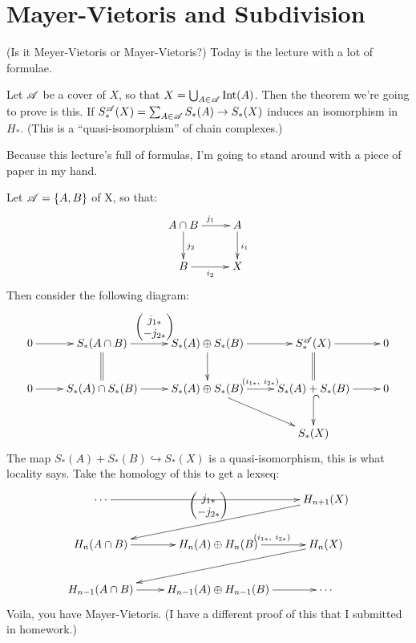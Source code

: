 \section{Mayer-Vietoris and Subdivision}
(Is it Meyer-Vietoris or Mayer-Vietoris?) Today is the lecture with a lot of formulae.
\begin{theorem}
Let $\mathscr{A}$ be a cover of $X$, so that $X=\bigcup_{A\in \mathscr{A}}\mathrm{Int}(A)$. Then the theorem we're going to prove is this. If $S^{\mathscr{A}}_\ast(X)=\sum_{A\in\mathscr{A}}S_\ast(A)\to S_\ast(X)$ induces an isomorphism in $ H_\ast$. (This is a ``quasi-isomorphism'' of chain complexes.)
\end{theorem}
Because this lecture's full of formulas, I'm going to stand around with a piece of paper in my hand.
\begin{example}
Let $\mathscr{A}=\{A,B\}$ of X, so that:
\begin{equation*}
\xymatrix{A\cap B\ar[r]^{j_1}\ar[d]^{j_2} & A\ar[d]^{i_1}\\
B\ar[r]_{i_2} & X}
\end{equation*}
Then consider the following diagram:
\begin{equation*}
\xymatrix{0\ar[r] & S_\ast(A\cap B)\ar[r]^{\begin{pmatrix}j_{1\ast} \\ -j_{2\ast}\end{pmatrix}}\ar@{=}[d] & S_\ast(A)\oplus S_\ast(B)\ar[r]\ar[d] & S^\sca_\ast(X)\ar[r]\ar@{=}[d] & 0\\
0\ar[r] & S_\ast(A)\cap S_\ast(B)\ar[r] & S_\ast(A)\oplus S_\ast(B)\ar[dr]\ar[r]^{(i_{1\ast},\ i_{2\ast})} & S_\ast(A)+S_\ast(B)\ar[r]\ar@{^(->}[d] & 0\\
 & & & S_\ast(X) &}
\end{equation*}
The map $S_\ast(A)+S_\ast(B)\hookrightarrow S_\ast(X)$ is a quasi-isomorphism, this is what locality says. Take the homology of this to get a lexseq:
\begin{equation*}
\xymatrix{ \cdots\ar[rr] & & H_{n+1}(X)\ar[dll]_{\begin{pmatrix}j_{1\ast} \\ -j_{2\ast}\end{pmatrix}}\\
 H_n(A\cap B)\ar[r] & H_n(A)\oplus H_n(B)\ar[r]^{(i_{1\ast},\ i_{2\ast})} & H_n(X)\ar[dll]\\
 H_{n-1}(A\cap B)\ar[r] & H_{n-1}(A)\oplus H_{n-1}(B)\ar[r] & \cdots}
\end{equation*}
Voila, you have Mayer-Vietoris. (I have a different proof of this that I submitted in homework.)
\end{example}
